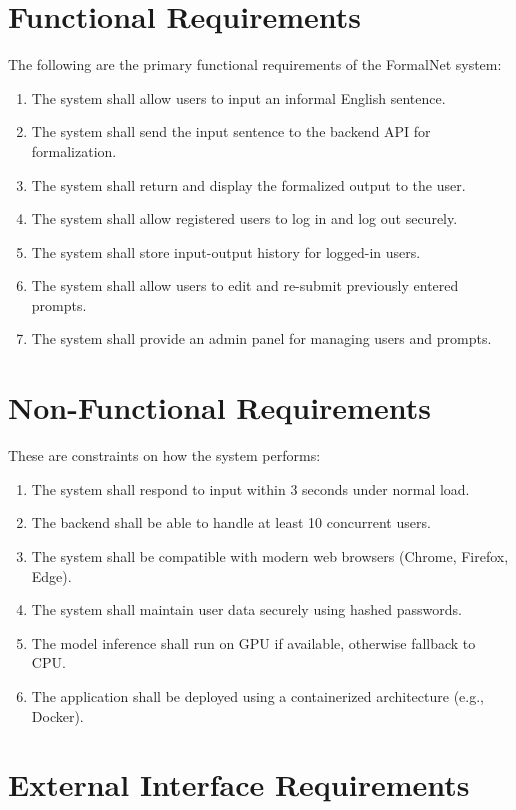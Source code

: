 \section{Functional Requirements}
The following are the primary functional requirements of the FormalNet system:

\begin{enumerate}[label=FR\arabic*.]
  \item The system shall allow users to input an informal English sentence.
  \item The system shall send the input sentence to the backend API for formalization.
  \item The system shall return and display the formalized output to the user.
  \item The system shall allow registered users to log in and log out securely.
  \item The system shall store input-output history for logged-in users.
  \item The system shall allow users to edit and re-submit previously entered prompts.
  \item The system shall provide an admin panel for managing users and prompts.
\end{enumerate}


\section{Non-Functional Requirements}

These are constraints on how the system performs:

\begin{enumerate}[label=NFR\arabic*.]
  \item The system shall respond to input within 3 seconds under normal load.
  \item The backend shall be able to handle at least 10 concurrent users.
  \item The system shall be compatible with modern web browsers (Chrome, Firefox, Edge).
  \item The system shall maintain user data securely using hashed passwords.
  \item The model inference shall run on GPU if available, otherwise fallback to CPU.
  \item The application shall be deployed using a containerized architecture (e.g., Docker).
\end{enumerate}


\section{External Interface Requirements}

